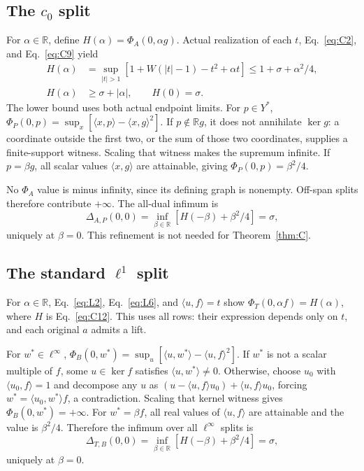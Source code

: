 \documentclass[11pt]{article}
\newcommand{\R}{\mathbb R}
\newcommand{\pair}[2]{\langle #1,#2\rangle}
\begin{document}
\subsection{The $c_0$ split}
\label{sec:C7}
For $\alpha\in\R$, define $H(\alpha)=\Phi_A(0,\alpha g)$.
Actual realization of each $t$, Eq.~\eqref{eq:C2}, and
Eq.~\eqref{eq:C9} yield
\begin{equation}
\begin{aligned}
H(\alpha)&=\sup_{|t|>1}[1+W(|t|-1)-t^2+\alpha t]
 \le1+\sigma+\alpha^2/4,\\
H(\alpha)&\ge\sigma+|\alpha|,\qquad H(0)=\sigma.
\end{aligned}
\tag{C12}\label{eq:C12}
\end{equation}
The lower bound uses both actual endpoint limits. For $p\in Y^*$,
$\Phi_P(0,p)=\sup_x[\pair{x}{p}-\pair{x}{g}^2]$.
If $p\notin\R g$, it does not annihilate $\ker g$: a coordinate outside
the first two, or the sum of those two coordinates, supplies a
finite-support witness. Scaling that witness makes the supremum infinite.
If $p=\beta g$, all scalar values $\pair{x}{g}$ are attainable, giving
$\Phi_P(0,p)=\beta^2/4$.

No $\Phi_A$ value is minus infinity, since its defining graph is nonempty.
Off-span splits therefore contribute $+\infty$. The all-dual infimum is
\[
\Delta_{A,P}(0,0)=\inf_{\beta\in\R}[H(-\beta)+\beta^2/4]=\sigma,
\]
uniquely at $\beta=0$. This refinement is not needed for
Theorem~\ref{thm:C}.

\subsection{The standard $\ell^1$ split}
\label{sec:L6}
For $\alpha\in\R$, Eq.~\eqref{eq:L2}, Eq.~\eqref{eq:L6}, and
$\pair{u}{f}=t$ show $\Phi_T(0,\alpha f)=H(\alpha)$, where $H$ is
Eq.~\eqref{eq:C12}. This uses all rows: their expression depends only on
$t$, and each original $a$ admits a lift.

For $w^*\in\ell^\infty$,
$\Phi_B(0,w^*)=\sup_u[\pair{u}{w^*}-\pair{u}{f}^2]$.
If $w^*$ is not a scalar multiple of $f$, some $u\in\ker f$ satisfies
$\pair{u}{w^*}\ne0$. Otherwise, choose $u_0$ with $\pair{u_0}{f}=1$ and
decompose any $u$ as $(u-\pair{u}{f}u_0)+\pair{u}{f}u_0$, forcing
$w^*=\pair{u_0}{w^*}f$, a contradiction.
Scaling that kernel witness gives $\Phi_B(0,w^*)=+\infty$.
For $w^*=\beta f$, all real values of $\pair{u}{f}$ are attainable and
the value is $\beta^2/4$. Therefore the infimum over all $\ell^\infty$
splits is
\[
\Delta_{T,B}(0,0)=\inf_{\beta\in\R}[H(-\beta)+\beta^2/4]=\sigma,
\]
uniquely at $\beta=0$.
\end{document}
